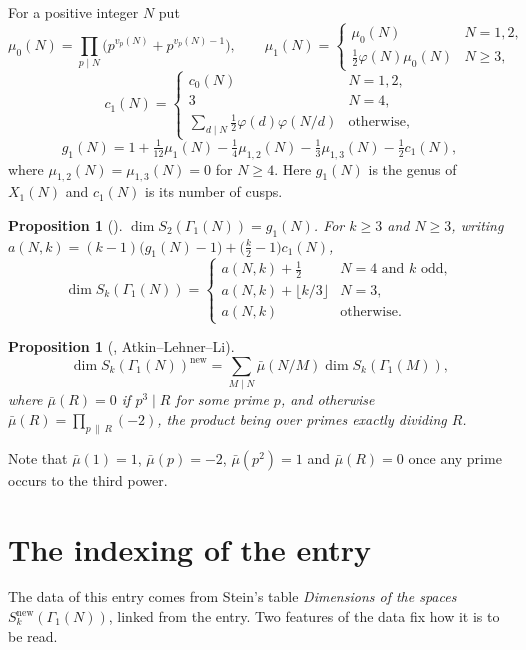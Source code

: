 \documentclass[11pt,a4paper]{article}
\theoremstyle{plain}
\newtheorem{proposition}[theorem]{Proposition}
\theoremstyle{definition}
\begin{document}
For a positive integer $N$ put
\[
  \mu_{0}(N)=\prod_{p\mid N}\bigl(p^{v_{p}(N)}+p^{v_{p}(N)-1}\bigr),\qquad
  \mu_{1}(N)=\begin{cases}\mu_{0}(N)&N=1,2,\\[2pt]
                          \tfrac12\varphi(N)\mu_{0}(N)&N\ge3,\end{cases}
\]
\[
  c_{1}(N)=\begin{cases}c_{0}(N)&N=1,2,\\[2pt]
                        3&N=4,\\[2pt]
                        \sum_{d\mid N}\tfrac12\varphi(d)\varphi(N/d)&\text{otherwise},
           \end{cases}
\]
\[
  g_{1}(N)=1+\tfrac1{12}\mu_{1}(N)-\tfrac14\mu_{1,2}(N)-\tfrac13\mu_{1,3}(N)
           -\tfrac12c_{1}(N),
\]
where $\mu_{1,2}(N)=\mu_{1,3}(N)=0$ for $N\ge4$. Here $g_{1}(N)$ is the genus of $X_{1}(N)$
and $c_{1}(N)$ is its number of cusps.

\begin{proposition}[{\cite[Prop.~6.6]{stein}}]\label{prop:dim}
$\dim S_{2}(\Gamma_{1}(N))=g_{1}(N)$. For $k\ge3$ and $N\ge3$, writing
$a(N,k)=(k-1)\bigl(g_{1}(N)-1\bigr)+\bigl(\tfrac{k}{2}-1\bigr)c_{1}(N)$,
\[
  \dim S_{k}(\Gamma_{1}(N))=\begin{cases}
    a(N,k)+\tfrac12&N=4\text{ and }k\text{ odd},\\[2pt]
    a(N,k)+\lfloor k/3\rfloor&N=3,\\[2pt]
    a(N,k)&\text{otherwise}.\end{cases}
\]
\end{proposition}

\begin{proposition}[{\cite[Prop.~6.6]{stein}}, Atkin--Lehner--Li]\label{prop:sieve}
\[
  \dim S_{k}(\Gamma_{1}(N))^{\mathrm{new}}
  =\sum_{M\mid N}\bar\mu(N/M)\dim S_{k}(\Gamma_{1}(M)),
\]
where $\bar\mu(R)=0$ if $p^{3}\mid R$ for some prime $p$, and otherwise
$\bar\mu(R)=\prod_{p\,\|\,R}(-2)$, the product being over primes exactly dividing $R$.
\end{proposition}

Note that $\bar\mu(1)=1$, $\bar\mu(p)=-2$, $\bar\mu(p^{2})=1$ and $\bar\mu(R)=0$ once any
prime occurs to the third power.

\section{The indexing of the entry}

The data of this entry comes from Stein's table \emph{Dimensions of the spaces
$S^{\mathrm{new}}_{k}(\Gamma_{1}(N))$}, linked from the entry. Two features of the data fix
how it is to be read.
\end{document}
